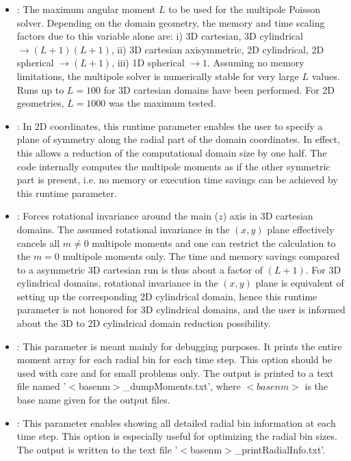 \begin{itemize}
\item
{}: The maximum angular moment $L$ to be used for the multipole
Poisson solver. Depending on the domain geometry, the memory and time scaling factors
due to this variable alone are: i) 3D cartesian, 3D cylindrical $\rightarrow (L+1)(L+1)$, ii)
3D cartesian axisymmetric, 2D cylindrical, 2D spherical $\rightarrow (L+1)$,
iii) 1D spherical $\rightarrow 1$. Assuming no memory limitations, the multipole
solver is numerically stable for very large $L$ values. Runs up to $L=100$
for 3D cartesian domains have been performed. For 2D geometries, $L=1000$ was the
maximum tested.
\item
{}: In 2D coordinates, this runtime parameter
enables the user to specify a plane of symmetry along the radial part of the
domain coordinates. In effect, this allows a reduction of the computational
domain size by one half. The code internally computes the multipole moments as if the
other symmetric part is present, i.e. no memory or execution time savings
can be achieved by this runtime parameter.
\item
{}: Forces rotational invariance around the main ($z$)
axis in 3D cartesian domains. The assumed rotational invariance in the $(x,y)$
plane effectively cancels all $m\neq 0$ multipole moments and one can restrict
the calculation to the $m=0$ multipole moments only. The time and memory
savings compared to a asymmetric 3D cartesian run is thus about a factor
of $(L+1)$. For 3D cylindrical domains, rotational invariance in the $(x,y)$
plane is equivalent of setting up the corresponding 2D cylindrical domain,
hence this runtime parameter is not honored for 3D cylindrical domains, and
the user is informed about the 3D to 2D cylindrical domain reduction possibility.
\item
{}: This parameter is meant mainly for debugging purposes.
It prints the entire moment array for each radial bin for each time step.
This option should be used with care and for small problems only. The output
is printed to a text file named '$<$basenm$>$\_dumpMoments.txt', where $<basenm>$
is the base name given for the output files.
\item
{}: This parameter enables showing all detailed radial
bin information at each time step. This option is especially useful for optimizing
the radial bin sizes. The output is written to the text file '$<$basenm$>$\_printRadialInfo.txt'.

\end{itemize}
